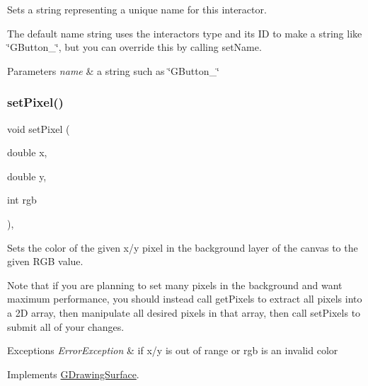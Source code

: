 Sets a string representing a unique name for this interactor. 

The default name string uses the interactor\textquotesingle{}s type and its ID to make a string like \char`\"{}\+G\+Button\+\_\char`\"{}, but you can override this by calling set\+Name. 
\begin{DoxyParams}{Parameters}
{\em name} & a string such as \char`\"{}\+G\+Button\+\_\char`\"{} \\
\hline
\end{DoxyParams}
\mbox{\label{classsgl_1_1GCanvas_a05b3441e912e4c0ed45e9ed43bb745d1}} 
\subsubsection{\texorpdfstring{set\+Pixel()}{setPixel()}\hspace{0.1cm}{\footnotesize\ttfamily [1/3]}}
{\footnotesize\ttfamily void set\+Pixel (\begin{DoxyParamCaption}\item[{double}]{x,  }\item[{double}]{y,  }\item[{int}]{rgb }\end{DoxyParamCaption})\hspace{0.3cm}{\ttfamily [override]}, {\ttfamily [virtual]}}



Sets the color of the given x/y pixel in the background layer of the canvas to the given R\+GB value. 

Note that if you are planning to set many pixels in the background and want maximum performance, you should instead call get\+Pixels to extract all pixels into a 2D array, then manipulate all desired pixels in that array, then call set\+Pixels to submit all of your changes.


\begin{DoxyExceptions}{Exceptions}
{\em Error\+Exception} & if x/y is out of range or rgb is an invalid color \\
\hline
\end{DoxyExceptions}


Implements \mbox{\hyperlink{classsgl_1_1GDrawingSurface_ac9f0a75ccb0abe1123046bab56479b84}{G\+Drawing\+Surface}}.

\mbox{\label{classsgl_1_1GCanvas_a92c3e3ef930ae7742ad384af28aac241}} 
